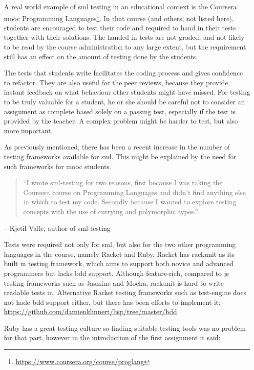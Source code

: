 \documentclass[11pt]{article}
\begin{document}
A real world example of \gls{sml} \gls{testing} in an educational context is the Coursera \gls{mooc} Programming Languages\footnote{\url{https://www.coursera.org/course/proglang}}.
In that course (and others, not listed here), students are encouraged to test their code and required to hand in their tests together with their solutions.
The handed in tests are not graded, and not likely to be read by the course administration to any large extent, but the requirement still has an effect on the amount of testing done by the students.

The tests that students write facilitates the coding process and gives confidence to refactor.
They are also useful for the peer reviews, because they provide instant feedback on what behaviour other students might have missed.
For testing to be truly valuable for a student, he or she should be careful not to consider an assignment as complete based solely on a passing test, especially if the test is provided by the teacher.
A complex problem might be harder to test, but also more important.

As previously mentioned, there has been a recent increase in the number of testing frameworks available for \gls{sml}. This might be explained by the need for such frameworks for \gls{mooc} students.

\begin{quote}
``I wrote sml-testing for two reasons, first because I was taking the Coursera course on Programming Languages and didn't find anything else in which to test my code. Secondly because I wanted to explore testing concepts with the use of currying and polymorphic types.''
\end{quote}

-- Kjetil Valle, author of sml-testing

Tests were required not only for \gls{sml}, but also for the two other programming languages in the course, namely Racket and Ruby.
Racket has rackunit as its built in testing framework, which aims to support both novice and advanced programmers but lacks \gls{bdd} support.
Although feature-rich, compared to \gls{js} testing frameworks such as Jasmine and Mocha, rackunit is hard to write readable tests in.
Alternative Racket testing frameworks such as test-engine does not hade \gls{bdd} support either, but there has been efforts to implement it: \url{https://github.com/damienklinnert/lisp/tree/master/bdd}

Ruby has a great testing culture so finding suitable testing tools was no problem for that part, however in the introduction of the first assignment it said:
\end{document}
